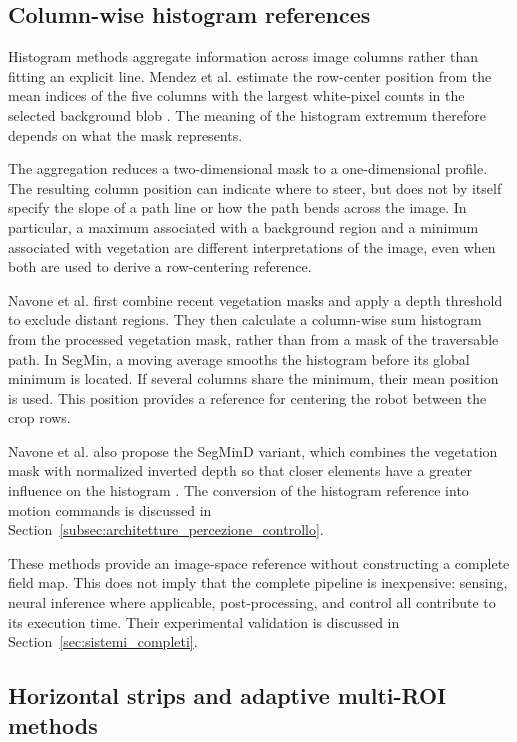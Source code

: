 \subsection{Column-wise histogram references}
\label{subsec:metodi_locali}

Histogram methods aggregate information across image columns rather
than fitting an explicit line. Mendez et al. estimate the row-center
position from the mean indices of the five columns with the largest
white-pixel counts in the selected background blob
\cite[Section~3.4.3]{mendez2023vineyards}. The meaning of the histogram
extremum therefore depends on what the mask represents.

The aggregation reduces a two-dimensional mask to a one-dimensional
profile. The resulting column position can indicate where to steer,
but does not by itself specify the slope of a path line or how the
path bends across the image. In particular, a maximum associated with
a background region and a minimum associated with vegetation are
different interpretations of the image, even when both are used to
derive a row-centering reference.

Navone et al. first combine recent vegetation masks and apply a depth
threshold to exclude distant regions. They then calculate a column-wise
sum histogram from the processed vegetation mask, rather than from a
mask of the traversable path. In SegMin, a moving average smooths the
histogram before its global minimum is located. If several columns share
the minimum, their mean position is used. This position provides a
reference for centering the robot between the crop rows.

Navone et al. also propose the SegMinD variant, which combines the
vegetation mask with normalized inverted depth so that closer elements
have a greater influence on the histogram
\cite[Section~3, including Sections~3.1--3.2]{navone2025gpsfree}.
The conversion of the histogram reference into motion commands is
discussed in Section~\ref{subsec:architetture_percezione_controllo}.

These methods provide an image-space reference without constructing a
complete field map. This does not imply that the complete pipeline is
inexpensive: sensing, neural inference where applicable, post-processing,
and control all contribute to its execution time. Their experimental
validation is discussed in Section~\ref{sec:sistemi_completi}.

\subsection{Horizontal strips and adaptive multi-ROI methods}
\label{subsec:strips}

